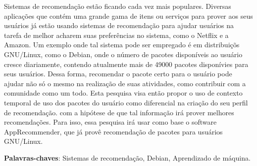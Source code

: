 \begin{resumo}

Sistemas de recomendação estão ficando cada vez mais populares. Diversas
aplicações que contém uma grande gama de itens ou serviços para prover aos seus
usuários já estão usando sistemas de recomendação para ajudar usuários na
tarefa de melhor acharem suas preferências no sistema, como o Netflix e a Amazon.
Um exemplo onde tal sistema pode ser empregado é em distribuiçõs GNU/Linux, como
o Debian, onde o número de pacotes disponíveis ao usuário cresce diariamente,
contendo atualmente mais de 49000 pacotes disponívies para seus usuários.
Dessa forma, recomendar o pacote certo para o usuário pode ajudar não só o mesmo
na realização de suas atividades, como contribuir com a comunidade como um todo.
Esta pesquisa visa então propor o uso de contexto temporal de uso dos pacotes do
usuário como diferencial na criação do seu perfil de recomendação. com a
hipótese de que tal informação irá prover melhores recomendações. Para isso,
essa pesquisa irá usar como base o software AppRecommender,
que já provê recomendação de pacotes para usuários GNU/Linux.


 \vspace{\onelineskip}
    
 \noindent
 \textbf{Palavras-chaves}: Sistemas de recomendação, Debian, Aprendizado de
 máquina.
\end{resumo}
